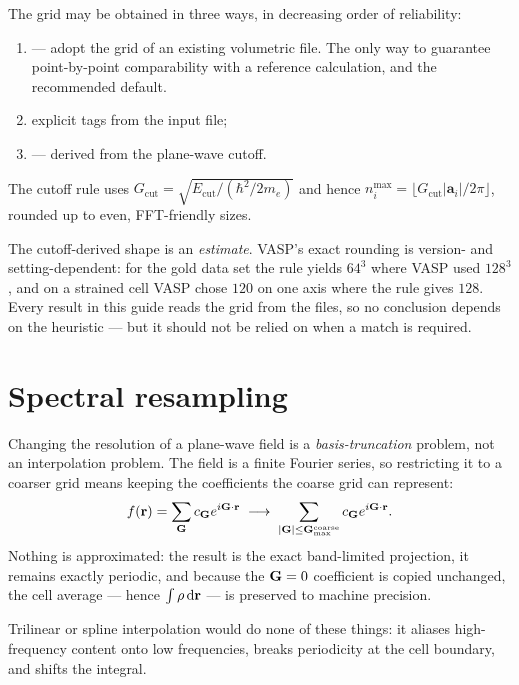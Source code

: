 The grid may be obtained in three ways, in decreasing order of reliability:

\begin{enumerate}
  \item {} --- adopt the grid of an existing
    volumetric file. The only way to guarantee point-by-point comparability
    with a reference calculation, and the recommended default.
  \item explicit  tags from the input file;
  \item {} --- derived from the plane-wave cutoff.
\end{enumerate}

The cutoff rule uses $G_{\mathrm{cut}}=\sqrt{E_{\mathrm{cut}}/(\hbar^2/2m_e)}$
and hence $n_i^{\max} = \lfloor G_{\mathrm{cut}}|\mathbf{a}_i|/2\pi \rfloor$,
rounded up to even, FFT-friendly sizes.

\begin{pwarn}
The cutoff-derived shape is an \emph{estimate}. VASP's exact rounding is
version- and setting-dependent: for the gold data set the rule yields $64^3$
where VASP used $128^3$, and on a strained cell VASP chose $120$ on one axis
where the rule gives $128$. Every result in this guide reads the grid from the
files, so no conclusion depends on the heuristic --- but it should not be relied
on when a match is required.
\end{pwarn}

\section{Spectral resampling}
\label{sec:resample}

Changing the resolution of a plane-wave field is a \emph{basis-truncation}
problem, not an interpolation problem. The field is a finite Fourier series, so
restricting it to a coarser grid means keeping the coefficients the coarse grid
can represent:
\begin{equation}
  f(\mathbf{r}) = \sum_{\mathbf{G}} c_{\mathbf{G}} e^{i\mathbf{G}\cdot\mathbf{r}}
  \;\longrightarrow\;
  \sum_{|\mathbf{G}| \le \mathbf{G}_{\max}^{\mathrm{coarse}}} c_{\mathbf{G}} e^{i\mathbf{G}\cdot\mathbf{r}} .
\end{equation}
Nothing is approximated: the result is the exact band-limited projection, it
remains exactly periodic, and because the $\mathbf{G}=0$ coefficient is copied
unchanged, the cell average --- hence $\int\rho\,\mathrm{d}\mathbf{r}$ --- is preserved
to machine precision.

Trilinear or spline interpolation would do none of these things: it aliases
high-frequency content onto low frequencies, breaks periodicity at the cell
boundary, and shifts the integral.

